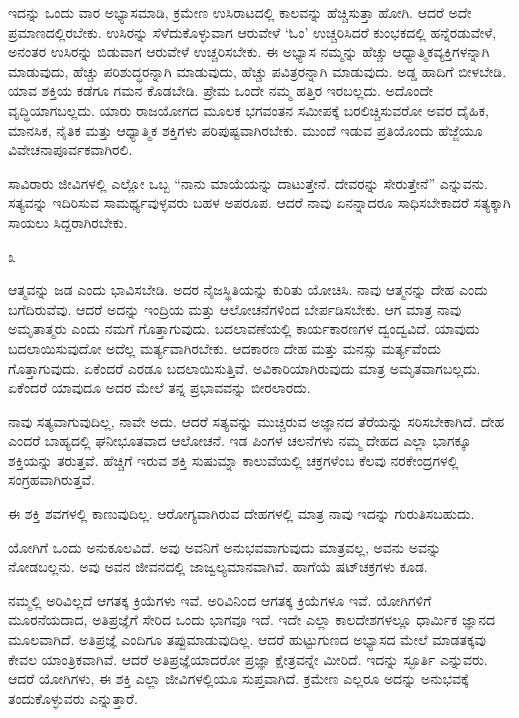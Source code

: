 ಇದನ್ನು ಒಂದು ವಾರ ಅಭ್ಯಾಸಮಾಡಿ, ಕ್ರಮೇಣ ಉಸಿರಾಟದಲ್ಲಿ ಕಾಲವನ್ನು ಹೆಚ್ಚಿಸುತ್ತಾ ಹೋಗಿ. ಆದರೆ ಅದೇ ಪ್ರಮಾಣದಲ್ಲಿರಬೇಕು. ಉಸಿರನ್ನು ಸೆಳೆದುಕೊಳ್ಳುವಾಗ ಆರುವೇಳೆ `ಓಂ' ಉಚ್ಚರಿಸಿದರೆ ಕುಂಭಕದಲ್ಲಿ ಹನ್ನೆರಡುವೇಳೆ, ಅನಂತರ ಉಸಿರನ್ನು ಬಿಡುವಾಗ ಆರುವೇಳೆ ಉಚ್ಚರಿಸಬೇಕು. ಈ ಅಭ್ಯಾಸ ನಮ್ಮನ್ನು ಹೆಚ್ಚು ಆಧ್ಯಾತ್ಮಿಕ\break ವ್ಯಕ್ತಿಗಳನ್ನಾಗಿ ಮಾಡುವುದು, ಹೆಚ್ಚು ಪರಿಶುದ್ಧರನ್ನಾಗಿ ಮಾಡುವುದು, ಹೆಚ್ಚು ಪವಿತ್ರರನ್ನಾಗಿ ಮಾಡುವುದು. ಅಡ್ಡ ಹಾದಿಗೆ ಬೀಳಬೇಡಿ. ಯಾವ ಶಕ್ತಿಯ ಕಡೆಗೂ ಗಮನ ಕೊಡಬೇಡಿ. ಪ್ರೇಮ ಒಂದೇ ನಮ್ಮ ಹತ್ತಿರ ಇರಬಲ್ಲದು. ಅದೊಂದೇ ವೃದ್ಧಿಯಾಗಬಲ್ಲದು. ಯಾರು ರಾಜಯೋಗದ ಮೂಲಕ ಭಗವಂತನ ಸಮೀಪಕ್ಕೆ ಬರಲಿಚ್ಚಿಸುವರೋ ಅವರ ದೈಹಿಕ, ಮಾನಸಿಕ, ನೈತಿಕ ಮತ್ತು ಆಧ್ಯಾತ್ಮಿಕ ಶಕ್ತಿಗಳು ಪರಿಪುಷ್ಟವಾಗಿರಬೇಕು. ಮುಂದೆ ಇಡುವ ಪ್ರತಿಯೊಂದು ಹೆಜ್ಜೆಯೂ ವಿವೇಚನಾಪೂರ್ವಕವಾಗಿರಲಿ.

ಸಾವಿರಾರು ಜೀವಿಗಳಲ್ಲಿ ಎಲ್ಲೋ ಒಬ್ಬ “ನಾನು ಮಾಯೆಯನ್ನು ದಾಟುತ್ತೇನೆ. ದೇವರನ್ನು ಸೇರುತ್ತೇನೆ'' ಎನ್ನುವನು. ಸತ್ಯವನ್ನು ಇದಿರಿಸುವ ಸಾಮರ್ಥ್ಯವುಳ್ಳವರು ಬಹಳ ಅಪರೂಪ. ಆದರೆ ನಾವು ಏನನ್ನಾದರೂ ಸಾಧಿಸಬೇಕಾದರೆ ಸತ್ಯಕ್ಕಾಗಿ ಸಾಯಲು ಸಿದ್ದರಾಗಿರಬೇಕು.

\begin{center}
೩
\end{center}

ಆತ್ಮವನ್ನು ಜಡ ಎಂದು ಭಾವಿಸಬೇಡಿ. ಅದರ ನೈಜಸ್ಥಿತಿಯನ್ನು ಕುರಿತು ಯೋಚಿಸಿ. ನಾವು ಆತ್ಮನನ್ನು ದೇಹ ಎಂದು ಬಗೆದಿರುವೆವು. ಆದರೆ ಅದನ್ನು ಇಂದ್ರಿಯ ಮತ್ತು ಆಲೋಚನೆಗಳಿಂದ ಬೇರ್ಪಡಿಸಬೇಕು. ಆಗ ಮಾತ್ರ ನಾವು ಅಮೃತಾತ್ಮರು ಎಂದು ನಮಗೆ ಗೊತ್ತಾಗುವುದು. ಬದಲಾವಣೆಯಲ್ಲಿ ಕಾರ್ಯಕಾರಣಗಳ ದ್ವಂದ್ವವಿದೆ. ಯಾವುದು ಬದಲಾಯಿಸುವುದೋ ಅದೆಲ್ಲ ಮರ್ತ್ಯವಾಗಿರಬೇಕು. ಆದಕಾರಣ ದೇಹ ಮತ್ತು ಮನಸ್ಸು ಮರ್ತ್ಯವೆಂದು ಗೊತ್ತಾಗುವುದು. ಏಕೆಂದರೆ ಎರಡೂ ಬದಲಾಯಿಸುತ್ತಿವೆ. ಅವಿಕಾರಿಯಾಗಿರುವುದು ಮಾತ್ರ ಅಮೃತವಾಗಬಲ್ಲದು. ಏಕೆಂದರೆ ಯಾವುದೂ ಅದರ ಮೇಲೆ ತನ್ನ ಪ್ರಭಾವವನ್ನು ಬೀರಲಾರದು.

ನಾವು ಸತ್ಯವಾಗುವುದಿಲ್ಲ, ನಾವೇ ಅದು. ಆದರೆ ಸತ್ಯವನ್ನು ಮುಚ್ಚಿರುವ ಅಜ್ಞಾನದ ತೆರೆಯನ್ನು ಸರಿಸಬೇಕಾಗಿದೆ. ದೇಹ ಎಂದರೆ ಬಾಹ್ಯದಲ್ಲಿ ಘನೀಭೂತವಾದ ಆಲೋಚನೆ. ಇಡ ಪಿಂಗಳ ಚಲನೆಗಳು ನಮ್ಮ ದೇಹದ ಎಲ್ಲಾ ಭಾಗಕ್ಕೂ ಶಕ್ತಿಯನ್ನು ತರುತ್ತವೆ. ಹೆಚ್ಚಿಗೆ ಇರುವ ಶಕ್ತಿ ಸುಷುಮ್ನಾ ಕಾಲುವೆಯಲ್ಲಿ ಚಕ್ರಗಳೆಂಬ ಕೆಲವು ನರಕೇಂದ್ರಗಳಲ್ಲಿ ಸಂಗ್ರಹವಾಗಿರುತ್ತವೆ.

ಈ ಶಕ್ತಿ ಶವಗಳಲ್ಲಿ ಕಾಣುವುದಿಲ್ಲ. ಆರೋಗ್ಯವಾಗಿರುವ ದೇಹಗಳಲ್ಲಿ ಮಾತ್ರ ನಾವು ಇದನ್ನು ಗುರುತಿಸಬಹುದು.

ಯೋಗಿಗೆ ಒಂದು ಅನುಕೂಲವಿದೆ. ಅವು ಅವನಿಗೆ ಅನುಭವವಾಗುವುದು ಮಾತ್ರವಲ್ಲ, ಅವನು ಅವನ್ನು ನೋಡಬಲ್ಲನು. ಅವು ಅವನ ಜೀವನದಲ್ಲಿ ಜಾಜ್ವಲ್ಯಮಾನವಾಗಿವೆ. ಹಾಗೆಯೆ ಷಟ್‌ಚಕ್ರಗಳು ಕೂಡ.

ನಮ್ಮಲ್ಲಿ ಅರಿವಿಲ್ಲದೆ ಆಗತಕ್ಕ ಕ್ರಿಯೆಗಳು ಇವೆ. ಅರಿವಿನಿಂದ ಆಗತಕ್ಕ ಕ್ರಿಯೆಗಳೂ ಇವೆ. ಯೋಗಿಗಳಿಗೆ ಮೂರನೆಯದಾದ, ಅತಿಪ್ರಜ್ಞೆಗೆ ಸೇರಿದ ಒಂದು ಭಾಗವೂ ಇದೆ. ಇದೇ ಎಲ್ಲಾ ಕಾಲದೇಶಗಳಲ್ಲೂ ಧಾರ್ಮಿಕ ಜ್ಞಾನದ ಮೂಲವಾಗಿದೆ. ಅತಿಪ್ರಜ್ಞೆ ಎಂದಿಗೂ ತಪ್ಪುಮಾಡುವುದಿಲ್ಲ. ಆದರೆ ಹುಟ್ಟುಗುಣದ ಅಭ್ಯಾಸದ ಮೇಲೆ ಮಾಡತಕ್ಕವು ಕೇವಲ ಯಾಂತ್ರಿಕವಾಗಿವೆ. ಆದರೆ ಅತಿಪ್ರಜ್ಞೆಯಾದರೋ ಪ್ರಜ್ಞಾ ಕ್ಷೇತ್ರವನ್ನೇ ಮೀರಿದೆ. ಇದನ್ನು ಸ್ಫೂರ್ತಿ ಎನ್ನುವರು. ಆದರೆ ಯೋಗಿಗಳು, ಈ ಶಕ್ತಿ ಎಲ್ಲಾ ಜೀವಿಗಳಲ್ಲಿಯೂ ಸುಪ್ತವಾಗಿದೆ. ಕ್ರಮೇಣ ಎಲ್ಲರೂ ಅದನ್ನು ಅನುಭವಕ್ಕೆ ತಂದುಕೊಳ್ಳುವರು ಎನ್ನುತ್ತಾರೆ.

